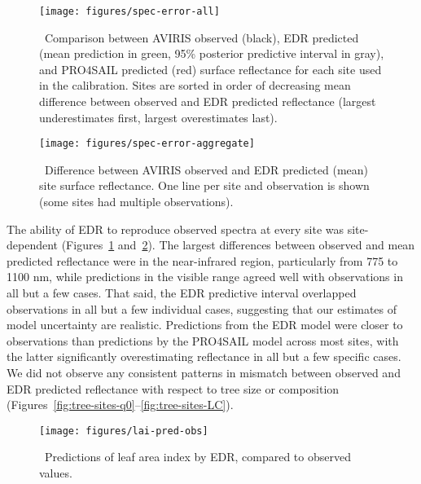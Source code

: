 \begin{figure}
  \centering
  \texttt{[image: figures/spec-error-all]}
  \caption{\label{fig:spec-error-all}\
    Comparison between AVIRIS observed (black),
    EDR predicted (mean prediction in green, 95\% posterior predictive interval in gray),
    and PRO4SAIL predicted (red)
    surface reflectance for each site used in the calibration.
    Sites are sorted in order of decreasing mean difference between observed and EDR predicted reflectance
    (largest underestimates first, largest overestimates last).
  }
\end{figure}

\begin{figure}
  \centering
  \texttt{[image: figures/spec-error-aggregate]}
  \caption{\label{fig:spec-error-aggregate}\
    Difference between AVIRIS observed and EDR predicted (mean) site surface reflectance.
    One line per site and observation is shown (some sites had multiple observations).
  }
\end{figure}

The ability of EDR to reproduce observed spectra at every site was site-dependent (Figures~\ref{fig:spec-error-all} and~\ref{fig:spec-error-aggregate}).
The largest differences between observed and mean predicted reflectance were in the near-infrared region, particularly from 775 to 1100 nm,
while predictions in the visible range agreed well with observations in all but a few cases.
That said, the EDR predictive interval overlapped observations in all but a few individual cases, suggesting that our estimates of model uncertainty are realistic.
Predictions from the EDR model were closer to observations than predictions by the PRO4SAIL model across most sites, with the latter significantly overestimating reflectance in all but a few specific cases.
We did not observe any consistent patterns in mismatch between observed and EDR predicted reflectance with respect to tree size or composition (Figures~\ref{fig:tree-sites-q0}--\ref{fig:tree-sites-LC}).

\begin{figure}
  \centering
  \texttt{[image: figures/lai-pred-obs]}
  \caption{\
    Predictions of leaf area index by EDR, compared to observed values.
  }\label{fig:lai-pred-obs}
\end{figure}

